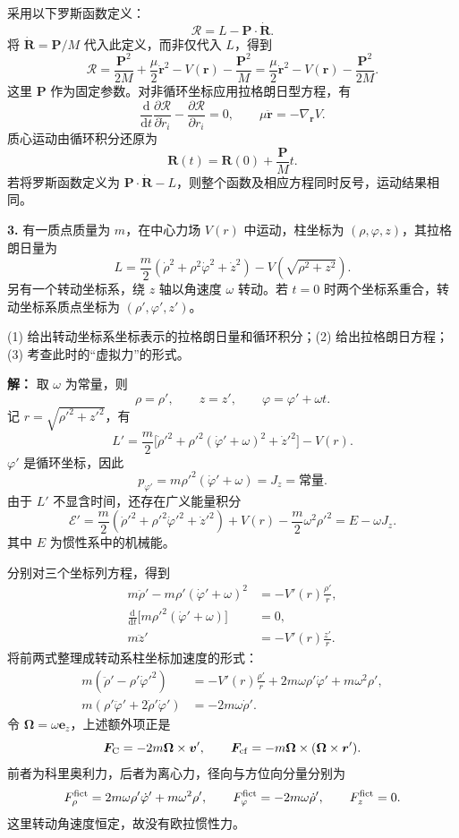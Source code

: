 \documentclass[11pt,a4paper]{ctexart}
\begin{document}
采用以下罗斯函数定义：
\[
\mathcal R=L-\bm P\cdot\dot{\bm R}.
\]
将 $\dot{\bm R}=\bm P/M$ 代入此定义，而非仅代入 $L$，得到
\[
\mathcal R=\frac{\bm P^2}{2M}+\frac\mu2\dot{\bm r}^{2}-V(\bm r)-\frac{\bm P^2}{M}
=\frac\mu2\dot{\bm r}^{2}-V(\bm r)-\frac{\bm P^2}{2M}.
\]
这里 $\bm P$ 作为固定参数。对非循环坐标应用拉格朗日型方程，有
\[
\frac{\mathrm d}{\mathrm dt}\frac{\partial\mathcal R}{\partial\dot r_i}-\frac{\partial\mathcal R}{\partial r_i}=0,
\qquad{\mu\ddot{\bm r}=-\nabla_{\bm r}V}.
\]
质心运动由循环积分还原为
\[
{\bm R(t)=\bm R(0)+\frac{\bm P}{M}t}.
\]
若将罗斯函数定义为 $\bm P\cdot\dot{\bm R}-L$，则整个函数及相应方程同时反号，运动结果相同。

\noindent\textbf{3.} 有一质点质量为 $m$，在中心力场 $V(r)$ 中运动，柱坐标为 $(\rho,\varphi,z)$，其拉格朗日量为
\[
L=\frac m2(\dot\rho^2+\rho^2\dot\varphi^2+\dot z^2)-V(\sqrt{\rho^2+z^2}).
\]
另有一个转动坐标系，绕 $z$ 轴以角速度 $\omega$ 转动。若 $t=0$ 时两个坐标系重合，转动坐标系质点坐标为 $(\rho',\varphi',z')$。

(1) 给出转动坐标系坐标表示的拉格朗日量和循环积分；(2) 给出拉格朗日方程；(3) 考查此时的“虚拟力”的形式。

\textbf{解：} 取 $\omega$ 为常量，则
\[
\rho=\rho',\qquad z=z',\qquad\varphi=\varphi'+\omega t.
\]
记 $r=\sqrt{\rho'^2+z'^2}$，有
\[
{L'=\frac m2\bigl[\dot\rho'^2+\rho'^2(\dot\varphi'+\omega)^2+\dot z'^2\bigr]-V(r)}.
\]
$\varphi'$ 是循环坐标，因此
\[
{p_{\varphi'}=m\rho'^2(\dot\varphi'+\omega)=J_z=\text{常量}}.
\]
由于 $L'$ 不显含时间，还存在广义能量积分
\[
\mathcal E'=\frac m2(\dot\rho'^2+\rho'^2\dot\varphi'^2+\dot z'^2)+V(r)-\frac m2\omega^2\rho'^2
=E-\omega J_z.
\]
其中 $E$ 为惯性系中的机械能。

分别对三个坐标列方程，得到
\[
{\begin{aligned}
m\ddot\rho'-m\rho'(\dot\varphi'+\omega)^2&=-V'(r)\frac{\rho'}r,\\
\frac{\mathrm d}{\mathrm dt}\bigl[m\rho'^2(\dot\varphi'+\omega)\bigr]&=0,\\
m\ddot z'&=-V'(r)\frac{z'}r.
\end{aligned}}
\]
将前两式整理成转动系柱坐标加速度的形式：
\[
\begin{aligned}
m(\ddot\rho'-\rho'\dot\varphi'^2)&=-V'(r)\frac{\rho'}r+2m\omega\rho'\dot\varphi'+m\omega^2\rho',\\
m(\rho'\ddot\varphi'+2\dot\rho'\dot\varphi')&=-2m\omega\dot\rho'.
\end{aligned}
\]
令 $\bm\Omega=\omega\bm e_z$，上述额外项正是
\[
{\bm F_{\rm C}=-2m\bm\Omega\times\bm v',\qquad
\bm F_{\rm cf}=-m\bm\Omega\times(\bm\Omega\times\bm r')}.
\]
前者为科里奥利力，后者为离心力，径向与方位向分量分别为
\[
F_\rho^{\rm fict}=2m\omega\rho'\dot\varphi'+m\omega^2\rho',\qquad
F_\varphi^{\rm fict}=-2m\omega\dot\rho',\qquad F_z^{\rm fict}=0.
\]
这里转动角速度恒定，故没有欧拉惯性力。
\end{document}
